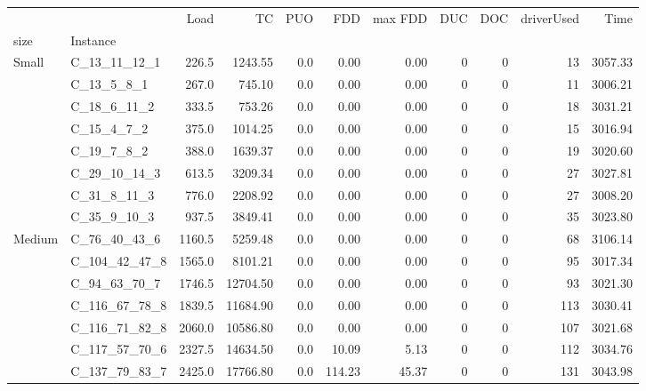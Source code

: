 \begin{tabular}{llrrrrrrrrr}
\toprule
      &                 &    Load &        TC &  PUO &     FDD &  max FDD &  DUC &  DOC &  driverUsed &     Time \\
size & Instance &         &           &      &         &          &      &      &             &          \\
\midrule
Small & C\_13\_11\_12\_1 &   226.5 &   1243.55 &  0.0 &    0.00 &     0.00 &    0 &    0 &          13 &  3057.33 \\
      & C\_13\_5\_8\_1 &   267.0 &    745.10 &  0.0 &    0.00 &     0.00 &    0 &    0 &          11 &  3006.21 \\
      & C\_18\_6\_11\_2 &   333.5 &    753.26 &  0.0 &    0.00 &     0.00 &    0 &    0 &          18 &  3031.21 \\
      & C\_15\_4\_7\_2 &   375.0 &   1014.25 &  0.0 &    0.00 &     0.00 &    0 &    0 &          15 &  3016.94 \\
      & C\_19\_7\_8\_2 &   388.0 &   1639.37 &  0.0 &    0.00 &     0.00 &    0 &    0 &          19 &  3020.60 \\
      & C\_29\_10\_14\_3 &   613.5 &   3209.34 &  0.0 &    0.00 &     0.00 &    0 &    0 &          27 &  3027.81 \\
      & C\_31\_8\_11\_3 &   776.0 &   2208.92 &  0.0 &    0.00 &     0.00 &    0 &    0 &          27 &  3008.20 \\
      & C\_35\_9\_10\_3 &   937.5 &   3849.41 &  0.0 &    0.00 &     0.00 &    0 &    0 &          35 &  3023.80 \\
Medium & C\_76\_40\_43\_6 &  1160.5 &   5259.48 &  0.0 &    0.00 &     0.00 &    0 &    0 &          68 &  3106.14 \\
      & C\_104\_42\_47\_8 &  1565.0 &   8101.21 &  0.0 &    0.00 &     0.00 &    0 &    0 &          95 &  3017.34 \\
      & C\_94\_63\_70\_7 &  1746.5 &  12704.50 &  0.0 &    0.00 &     0.00 &    0 &    0 &          93 &  3021.30 \\
      & C\_116\_67\_78\_8 &  1839.5 &  11684.90 &  0.0 &    0.00 &     0.00 &    0 &    0 &         113 &  3030.41 \\
      & C\_116\_71\_82\_8 &  2060.0 &  10586.80 &  0.0 &    0.00 &     0.00 &    0 &    0 &         107 &  3021.68 \\
      & C\_117\_57\_70\_6 &  2327.5 &  14634.50 &  0.0 &   10.09 &     5.13 &    0 &    0 &         112 &  3034.76 \\
      & C\_137\_79\_83\_7 &  2425.0 &  17766.80 &  0.0 &  114.23 &    45.37 &    0 &    0 &         131 &  3043.98 \\

\end{tabular}
